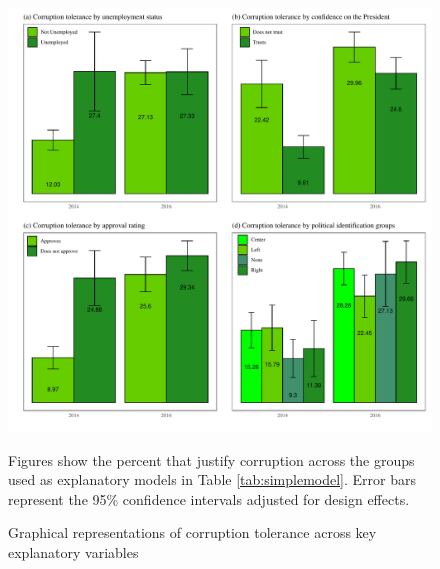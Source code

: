\documentclass[12pt,a4]{article}\usepackage[]{graphicx}\usepackage[]{xcolor}
\makeatletter
\def\maxwidth{ %
  \ifdim\Gin@nat@width>\linewidth
    \linewidth
  \else
    \Gin@nat@width
  \fi
}
\newenvironment{knitrout}{}{} %
\makeatother
\begin{document}
\begin{figure}[htbp!]
\begin{knitrout}
\color{fgcolor}

{\centering \includegraphics[width=\maxwidth]{figure/difgraph-1} 

}


\end{knitrout}
\caption{Graphical representations of corruption tolerance across key explanatory variables}
\label{fig:difgraph}
Figures show the percent that justify corruption across the groups used as explanatory models in Table \ref{tab:simplemodel}. Error bars represent the 95\% confidence intervals adjusted for design effects.
\end{figure}
\end{document}
